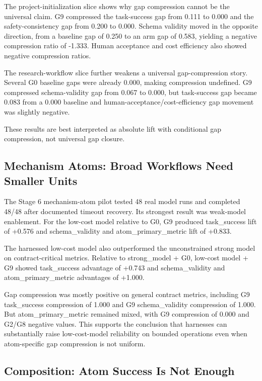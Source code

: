\documentclass[11pt]{article}
\begin{document}
The project-initialization slice shows why gap compression cannot be the universal claim. G9 compressed the task-success gap from 0.111 to 0.000 and the safety-consistency gap from 0.200 to 0.000. Schema validity moved in the opposite direction, from a baseline gap of 0.250 to an arm gap of 0.583, yielding a negative compression ratio of -1.333. Human acceptance and cost efficiency also showed negative compression ratios.

The research-workflow slice further weakens a universal gap-compression story. Several G0 baseline gaps were already 0.000, making compression undefined. G9 compressed schema-validity gap from 0.067 to 0.000, but task-success gap became 0.083 from a 0.000 baseline and human-acceptance/cost-efficiency gap movement was slightly negative.

These results are best interpreted as absolute lift with conditional gap compression, not universal gap closure.

\subsection{Mechanism Atoms: Broad Workflows Need Smaller Units}

The Stage 6 mechanism-atom pilot tested 48 real model runs and completed 48/48 after documented timeout recovery. Its strongest result was weak-model enablement. For the low-cost model relative to G0, G9 produced task\_success lift of +0.576 and schema\_validity and atom\_primary\_metric lift of +0.833.

The harnessed low-cost model also outperformed the unconstrained strong model on contract-critical metrics. Relative to strong\_model + G0, low-cost model + G9 showed task\_success advantage of +0.743 and schema\_validity and atom\_primary\_metric advantages of +1.000.

Gap compression was mostly positive on general contract metrics, including G9 task\_success compression of 1.000 and G9 schema\_validity compression of 1.000. But atom\_primary\_metric remained mixed, with G9 compression of 0.000 and G2/G8 negative values. This supports the conclusion that harnesses can substantially raise low-cost-model reliability on bounded operations even when atom-specific gap compression is not uniform.

\subsection{Composition: Atom Success Is Not Enough}
\end{document}

